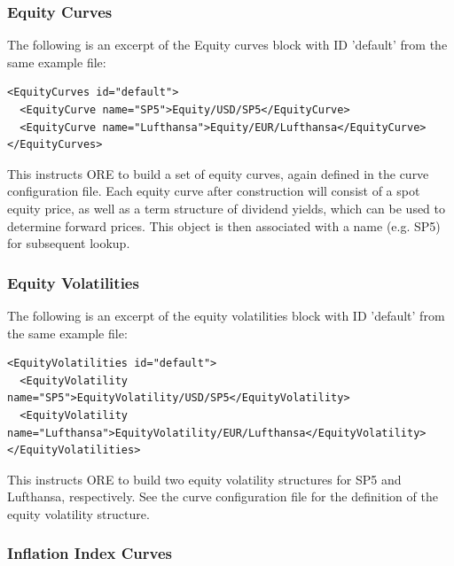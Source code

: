 \subsubsection{Equity Curves}
The following is an excerpt of the Equity curves block with ID 'default' from the same example file:

\begin{listing}[H]
\begin{verbatim}
<EquityCurves id="default">
  <EquityCurve name="SP5">Equity/USD/SP5</EquityCurve>
  <EquityCurve name="Lufthansa">Equity/EUR/Lufthansa</EquityCurve>
</EquityCurves>
\end{verbatim}
\caption{Equity curves block with ID 'default'}
\label{lst:eqcurve_spec}
\end{listing}

This instructs ORE to build a set of equity curves, again defined in the curve configuration file. Each equity curve 
after construction will consist of a spot equity price, as well as a term structure of dividend yields, which can be 
used to determine forward prices. This object is then associated with a name (e.g. SP5) for subsequent lookup. 

\subsubsection{Equity Volatilities}

The following is an excerpt of the equity volatilities block with ID 'default' from the same example file:

\begin{listing}[H]
\begin{verbatim}
<EquityVolatilities id="default">
  <EquityVolatility name="SP5">EquityVolatility/USD/SP5</EquityVolatility>
  <EquityVolatility name="Lufthansa">EquityVolatility/EUR/Lufthansa</EquityVolatility>
</EquityVolatilities>
\end{verbatim}
\caption{EQ volatility block with ID 'default'}
\label{lst:eqvol_spec}
\end{listing}

This instructs ORE to build two equity volatility structures for SP5 and Lufthansa, respectively. See the curve
configuration file for the definition of the equity volatility structure.


\subsubsection{Inflation Index Curves}

